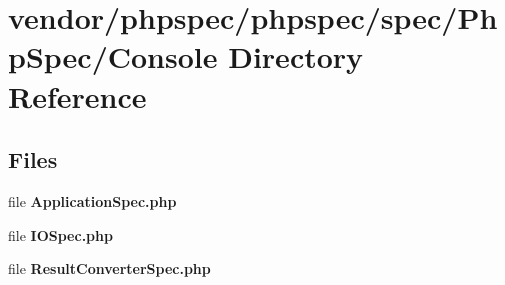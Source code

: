 \section{vendor/phpspec/phpspec/spec/\+Php\+Spec/\+Console Directory Reference}
\label{dir_0b2d82e84b37b10f78082a66986a73e9}
\subsection*{Files}
\begin{DoxyCompactItemize}
\item 
file {\bf Application\+Spec.\+php}
\item 
file {\bf I\+O\+Spec.\+php}
\item 
file {\bf Result\+Converter\+Spec.\+php}
\end{DoxyCompactItemize}
